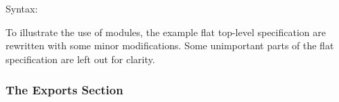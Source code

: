 \documentclass[\pformat,12pt]{article}
\begin{document}
\begin{description}
\item[Syntax:]

\end{description}

To illustrate the use of modules, the example flat top-level
specification are rewritten with some minor modifications.  Some
unimportant parts of the flat specification are left out for clarity.

\subsubsection{The Exports Section}
\end{document}
